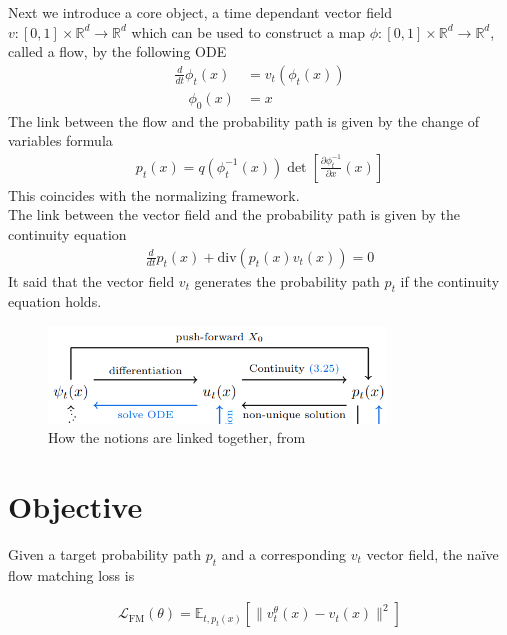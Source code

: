 \documentclass[a4paper,12pt]{article}
\begin{document}
\newpage

Next we introduce a core object, a time dependant vector field \(v:[0,1]\times \mathbb{R}^d\rightarrow\mathbb{R}^d\) which can be used to construct a map \(\phi:[0,1]\times\mathbb{R}^d\rightarrow\mathbb{R}^d\), called a flow, by the following ODE
\begin{align}
    \frac{d}{dt}\phi_t(x)&=v_t(\phi_t(x))\\
    \quad \phi_0(x)&=x \nonumber
\end{align}  
The link between the flow and the probability path is given by the change of variables formula 
\begin{align}
    p_t(x)=q(\phi_t^{-1}(x))\det \left[\frac{\partial\phi_t^{-1}}{\partial x}(x)\right]
\end{align}
This coincides with the normalizing framework. \\
The link between the vector field and the probability path is given by the continuity equation 
\begin{align}
  \frac{d}{dt}p_t(x)+\text{div}(p_t(x)v_t(x))=0
\end{align}
It said that the vector field \(v_t\) generates the probability path \(p_t\) if the continuity equation holds.\\
\bigskip
\begin{figure}[h]
    \centering
    \includegraphics[width=0.8\textwidth]{FlowMatchingBasics.png}
    \caption{How the notions are linked together, from \cite{lipman2024flowmatchingguidecode}}
    \label{fig:flow_matching_basics}
\end{figure}

\section{Objective}
Given a target probability path \(p_t\) and a corresponding \(v_t\) vector field, the naïve flow matching loss is 

\begin{align}
    \mathcal{L}_\text{FM}(\theta) = \mathbb{E}_{t,p_t(x)}\left[\|v_t^\theta(x)-v_t(x)\|^2\right]
\end{align}
\end{document}
